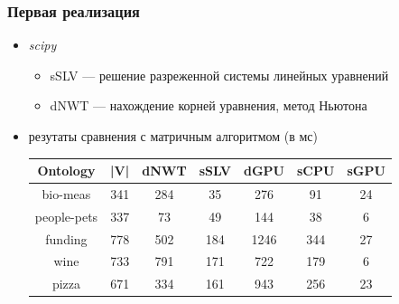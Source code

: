 \documentclass[xcolor=table]{beamer}
\begin{document}
\begin{frame}[fragile]
  \transwipe[direction=90]
  \frametitle{Первая реализация}

\begin{itemize}
    \item \textit{scipy}
    \begin{itemize}
        \item sSLV --- решение разреженной системы линейных уравнений
        \item dNWT --- нахождение корней уравнения, метод Ньютона
    \end{itemize}
    \item резутаты сравнения с матричным алгоритмом (в мс)

        \begin{table}[h]
        \centering
        \begin{tabular}{ | c | c || c | c || c | c | c |}
        \hline
        Ontology    & |V| & dNWT & sSLV & dGPU & sCPU &  sGPU \\
        \hline
        \hline
        bio-meas    & 341 &  284 & 35   & 276  & 91  & 24\\
        people-pets & 337 &  73  & 49   & 144  & 38  & 6\\
        funding     & 778 &  502 & 184  & 1246 & 344 & 27\\
        wine        & 733 &  791 & 171  & 722  & 179 & 6\\
        pizza       & 671 &  334 & 161  & 943  & 256 & 23\\
        \hline
        \end{tabular}
        
        \end{table}

\end{itemize}
\end{frame}
\end{document}
